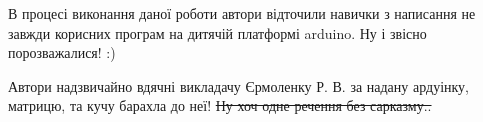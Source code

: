 
В процесі виконання даної роботи автори відточили навички з написання не завжди корисних програм на дитячій платформі arduino. Ну і звісно порозважалися! :)

Автори надзвичайно вдячні викладачу Єрмоленку Р. В. за надану ардуінку, матрицю, та кучу барахла до неї! \sout{Ну хоч одне речення без сарказму..}
